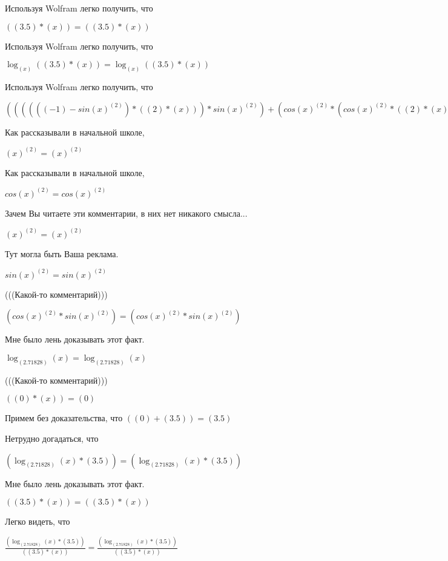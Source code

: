 \documentclass[12pt,a4paper,fleqn]{article}
\theoremstyle{definition}
\begin{document}
Используя Wolfram легко получить, что

$(( 3.5 ) * ( x )) = (( 3.5 ) * ( x ))$

Используя Wolfram легко получить, что

$\log_{( x )}{(( 3.5 ) * ( x ))} = \log_{( x )}{(( 3.5 ) * ( x ))}$

Используя Wolfram легко получить, что

$(((((( -1 ) - sin{( x )}^{( 2 )}) * (( 2 ) * ( x ))) * sin{( x )}^{( 2 )}) + (cos{( x )}^{( 2 )} * (cos{( x )}^{( 2 )} * (( 2 ) * ( x ))))) * \log_{( x )}{(( 3.5 ) * ( x ))}) = (((((( -1 ) - sin{( x )}^{( 2 )}) * (( 2 ) * ( x ))) * sin{( x )}^{( 2 )}) + (cos{( x )}^{( 2 )} * (cos{( x )}^{( 2 )} * (( 2 ) * ( x ))))) * \log_{( x )}{(( 3.5 ) * ( x ))})$

Как рассказывали в начальной школе,

${( x )}^{( 2 )} = {( x )}^{( 2 )}$

Как рассказывали в начальной школе,

$cos{( x )}^{( 2 )} = cos{( x )}^{( 2 )}$

Зачем Вы читаете эти комментарии, в них нет никакого смысла...

${( x )}^{( 2 )} = {( x )}^{( 2 )}$

Тут могла быть Ваша реклама.

$sin{( x )}^{( 2 )} = sin{( x )}^{( 2 )}$

(((Какой-то комментарий)))

$(cos{( x )}^{( 2 )} * sin{( x )}^{( 2 )}) = (cos{( x )}^{( 2 )} * sin{( x )}^{( 2 )})$

Мне было лень доказывать этот факт.

$\log_{( 2.71828 )}{( x )} = \log_{( 2.71828 )}{( x )}$

(((Какой-то комментарий)))

$(( 0 ) * ( x )) = ( 0 )$

Примем без доказательства, что
$(( 0 ) + ( 3.5 )) = ( 3.5 )$

Нетрудно догадаться, что

$(\log_{( 2.71828 )}{( x )} * ( 3.5 )) = (\log_{( 2.71828 )}{( x )} * ( 3.5 ))$

Мне было лень доказывать этот факт.

$(( 3.5 ) * ( x )) = (( 3.5 ) * ( x ))$

Легко видеть, что

$\frac{(\log_{( 2.71828 )}{( x )} * ( 3.5 ))}{(( 3.5 ) * ( x ))}
 = \frac{(\log_{( 2.71828 )}{( x )} * ( 3.5 ))}{(( 3.5 ) * ( x ))}
$
\end{document}
